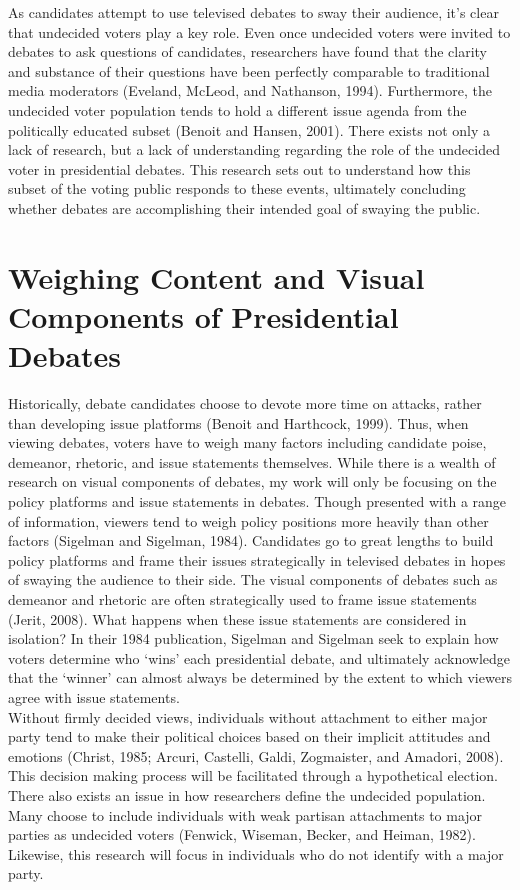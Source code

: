 \documentclass[12pt]{article}
\begin{document}
As candidates attempt to use televised debates to sway their audience, it’s clear that undecided voters play a key role. Even once undecided voters were invited to debates to ask questions of candidates, researchers have found that the clarity and substance of their questions have been perfectly comparable to traditional media moderators (Eveland, McLeod, and Nathanson, 1994). Furthermore, the undecided voter population tends to hold a different issue agenda from the politically educated subset (Benoit and Hansen, 2001). There exists not only a lack of research, but a lack of understanding regarding the role of the undecided voter in presidential debates. This research sets out to understand how this subset of the voting public responds to these events, ultimately concluding whether debates are accomplishing their intended goal of swaying the public.\\


\section*{Weighing Content and Visual Components of Presidential Debates}

Historically, debate candidates choose to devote more time on attacks, rather than developing issue platforms (Benoit and Harthcock, 1999). Thus, when viewing debates, voters have to weigh many factors including candidate poise, demeanor, rhetoric, and issue statements themselves. While there is a wealth of research on visual components of debates, my work will only be focusing on the policy platforms and issue statements in debates. Though presented with a range of information, viewers tend to weigh policy positions more heavily than other factors (Sigelman and Sigelman, 1984). Candidates go to great lengths to build policy platforms and frame their issues strategically in televised debates in hopes of swaying the audience to their side. The visual components of debates such as demeanor and rhetoric are often strategically used to frame issue statements (Jerit, 2008). What happens when these issue statements are considered in isolation? In their 1984 publication, Sigelman and Sigelman seek to explain how voters determine who ‘wins’ each presidential debate, and ultimately acknowledge that the ‘winner’ can almost always be determined by the extent to which viewers agree with issue statements. \\

Without firmly decided views, individuals without attachment to either major party tend to make their political choices based on their implicit attitudes and emotions (Christ, 1985; Arcuri, Castelli, Galdi, Zogmaister, and Amadori, 2008). This decision making process will be facilitated through a hypothetical election. There also exists an issue in how researchers define the undecided population. Many choose to include individuals with weak partisan attachments to major parties as undecided voters (Fenwick, Wiseman, Becker, and Heiman, 1982). Likewise, this research will focus in individuals who do not identify with a major party.\\
\end{document}
